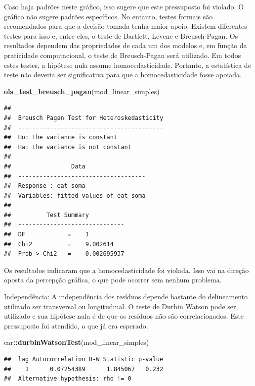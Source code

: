 \documentclass[
]{book}
\newenvironment{Shaded}{\begin{snugshade}}{\end{snugshade}}
\newcommand{\KeywordTok}[1]{\textcolor[rgb]{0.13,0.29,0.53}{\textbf{#1}}}
\newcommand{\NormalTok}[1]{#1}
\newcommand{\OperatorTok}[1]{\textcolor[rgb]{0.81,0.36,0.00}{\textbf{#1}}}
\begin{document}
Caso haja padrões neste gráfico, isso sugere que este pressuposto foi violado. O gráfico não sugere padrões específicos. No entanto, testes formais são recomendados para que a decisão tomada tenha maior apoio. Existem diferentes testes para isso e, entre eles, o teste de Bartlett, Levene e Breusch-Pagan. Os resultados dependem das propriedades de cada um dos modelos e, em função da praticidade computacional, o teste de Breusch-Pagan será utilizado. Em todos estes testes, a hipótese nula assume homocedasticidade. Portanto, a estatística de teste não deveria ser significativa para que a homocedasticidade fosse apoiada.

\begin{Shaded}
\begin{Highlighting}[]
\KeywordTok{ols_test_breusch_pagan}\NormalTok{(mod_linear_simples)}
\end{Highlighting}
\end{Shaded}

\begin{verbatim}
## 
##  Breusch Pagan Test for Heteroskedasticity
##  -----------------------------------------
##  Ho: the variance is constant            
##  Ha: the variance is not constant        
## 
##                 Data                 
##  ------------------------------------
##  Response : eat_soma 
##  Variables: fitted values of eat_soma 
## 
##          Test Summary          
##  ------------------------------
##  DF            =    1 
##  Chi2          =    9.002614 
##  Prob > Chi2   =    0.002695937
\end{verbatim}

Os resultados indicaram que a homocedasticidade foi violada. Isso vai na direção oposta da percepção gráfica, o que pode ocorrer sem nenhum problema.

Independência: A independência dos resíduos depende bastante do delineamento utilizado ser transversal ou longitudinal. O teste de Durbin Watson pode ser utilizado e sua hipótese nula é de que os resíduos não são correlacionados. Este pressuposto foi atendido, o que já era esperado.

\begin{Shaded}
\begin{Highlighting}[]
\NormalTok{car}\OperatorTok{::}\KeywordTok{durbinWatsonTest}\NormalTok{(mod_linear_simples)}
\end{Highlighting}
\end{Shaded}

\begin{verbatim}
##  lag Autocorrelation D-W Statistic p-value
##    1      0.07254389      1.845067   0.232
##  Alternative hypothesis: rho != 0
\end{verbatim}
\end{document}
